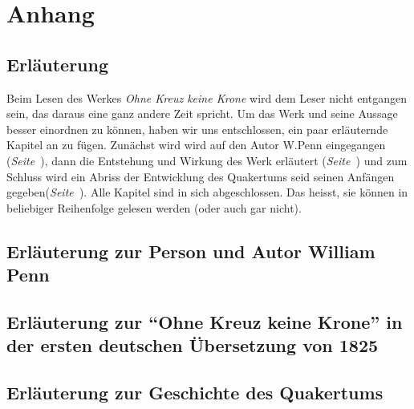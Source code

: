 \documentclass[a5paper,pagesize,9pt]{scrbook}
\begin{document}
\setcounter{secnumdepth}{0}

\part{Anhang}
\chapter{Erläuterung}

Beim Lesen des Werkes \textit{Ohne Kreuz keine Krone} wird dem Leser nicht
entgangen sein, das daraus eine ganz andere Zeit spricht. Um das Werk und seine
Aussage besser einordnen zu können, haben wir uns entschlossen, ein paar
erläuternde Kapitel an zu fügen. Zunächst wird wird auf den Autor
W.Penn eingegangen (\textit{Seite~\pageref{ref:zum_autor_penn}}), dann die Entstehung und Wirkung des Werk erläutert (\textit{Seite~\pageref{ref:zum_werk}}) und zum Schluss
wird ein Abriss der Entwicklung des Quakertums seid seinen Anfängen
gegeben(\textit{Seite~\pageref{ref:entwicklung_quakertum}}). Alle Kapitel
sind in sich abgeschlossen. Das heisst, sie können in beliebiger Reihenfolge
gelesen werden (oder auch gar nicht).

\chapter{Erläuterung zur Person und Autor William Penn} \label{ref:zum_autor_penn}


\chapter[Erläuterung zur "`Ohne Kreuz keine Krone"']{Erläuterung zur "`Ohne Kreuz keine Krone"' in der ersten deutschen Übersetzung von 1825} \label{ref:zum_werk}




\chapter{Erläuterung zur Geschichte des Quakertums}
\label{ref:entwicklung_quakertum}
\end{document}
